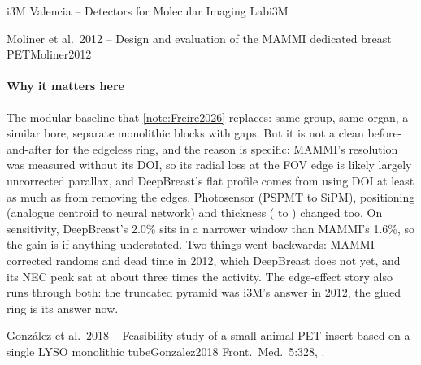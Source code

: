 \begin{programnote}{i3M Valencia -- Detectors for Molecular Imaging Lab}{i3M}
\begin{papernote}{Moliner et al.\ 2012 -- Design and evaluation of the MAMMI dedicated breast PET}{Moliner2012}
\paragraph{Why it matters here}
The modular baseline that \ref{note:Freire2026} replaces: same group, same
organ, a similar bore, separate monolithic blocks with gaps. But it is not a
clean before-and-after for the edgeless ring, and the reason is specific:
MAMMI's resolution was measured without its DOI, so its radial loss at the
FOV edge is likely largely uncorrected parallax, and DeepBreast's flat profile comes
from using DOI at least as much as from removing the edges. Photosensor
(PSPMT to SiPM), positioning (analogue centroid to neural network) and
thickness ( to ) changed too. On sensitivity, DeepBreast's
2.0\% sits in a narrower window than MAMMI's 1.6\%, so the gain is if
anything understated. Two things went backwards: MAMMI corrected randoms and
dead time in 2012, which DeepBreast does not yet, and its NEC peak sat at about
three times the activity. The edge-effect story also runs through both: the
truncated pyramid was i3M's answer in 2012, the glued ring is its answer
now.

\end{papernote}

\begin{papernote}{González et al.\ 2018 -- Feasibility study of a small animal PET insert based on a single LYSO monolithic tube}{Gonzalez2018}
Front.\ Med.\ 5:328, .


\end{papernote}
\end{programnote}
